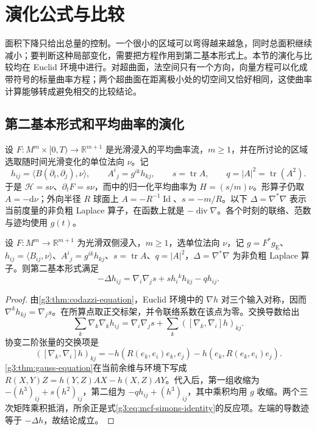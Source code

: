 
% 
% 

\section{演化公式与比较}
\label{g3:sec:2802}

面积下降只给出总量的控制。一个很小的区域可以弯得越来越急，同时总面积继续减小；要判断这种局部变化，需要把方程作用到第二基本形式上。本节的演化与比较均在 Euclid 环境中进行。对超曲面，法空间只有一个方向，向量方程可以化成带符号的标量曲率方程；两个超曲面在距离极小处的切空间又恰好相同，这使曲率计算能够转成避免相交的比较结论。

\subsection{第二基本形式和平均曲率的演化}
\label{g3:subsec:2802:01}
设 \(F:M^m\times[0,T)\to\mathbb R^{m+1}\) 是光滑浸入的平均曲率流，\(m\ge1\)，并在所讨论的区域选取随时间光滑变化的单位法向 \(\nu\)。记
\[
	h_{ij}=\langle B(\partial_i,\partial_j),\nu\rangle,
	\qquad A^i{}_j=g^{ik}h_{kj},
	\qquad s=\operatorname{tr}A,
	\qquad q=|A|^2=\operatorname{tr}(A^2).
\]
于是 \(\mathcal H=s\nu\)、\(\partial_tF=s\nu\)，而中的归一化平均曲率为 \(H=(s/m)\nu\)。形算子仍取 \(A=-\mathrm d\nu\)；外向半径 \(R\) 球面上 \(A=-R^{-1}\operatorname{Id}\)、\(s=-m/R\)。以下 \(\Delta=\nabla^*\nabla\) 表示当前度量的非负粗 Laplace 算子，在函数上就是 \(-\operatorname{div}\nabla\)。各个时刻的联络、范数与迹均使用 \(g(t)\)。

\begin{lemma}\label{g3:lem:mcf-simons-identity}
	设 \(F:M^m\to\mathbb R^{m+1}\) 为光滑双侧浸入，\(m\ge1\)，选单位法向 \(\nu\)，记 \(g=F^*g_{\mathrm E}\)、\(h_{ij}=\langle B_{ij},\nu\rangle\)、\(A^i{}_j=g^{ik}h_{kj}\)、\(s=\operatorname{tr}A\)、\(q=|A|^2\)，\(\Delta=\nabla^*\nabla\) 为非负粗 Laplace 算子。则第二基本形式满足
	\begin{equation}\label{g3:eq:mcf-simons-identity}
		-\Delta h_{ij}=\nabla_i\nabla_j s+s h_i{}^k h_{kj}-q h_{ij}.
	\end{equation}
\end{lemma}
\begin{proof}
	由\cref{g3:thm:codazzi-equation}，Euclid 环境中的 \(\nabla h\) 对三个输入对称，因而 \(\nabla^k h_{kj}=\nabla_j s\)。在所算点取正交标架，并令联络系数在该点为零。交换导数给出
	\[
		\sum_k\nabla_k\nabla_k h_{ij}
		=\nabla_i\nabla_j s+
		\sum_k([\nabla_k,\nabla_i]h)_{kj}.
	\]
	协变二阶张量的交换项是
	\[
		([\nabla_k,\nabla_i]h)_{kj}
		=-h(R(e_k,e_i)e_k,e_j)-h(e_k,R(e_k,e_i)e_j).
	\]
	\cref{g3:thm:gauss-equation}在当前余维与环境下写成
	\(R(X,Y)Z=h(Y,Z)AX-h(X,Z)AY\)。代入后，第一组收缩为
	\(- (h^3)_{ij}+s(h^2)_{ij}\)，第二组为
	\(-q h_{ij}+(h^3)_{ij}\)，其中乘积均用 \(g\) 收缩。两个三次矩阵乘积抵消，所余正是式\eqref{g3:eq:mcf-simons-identity}的反应项。左端的导数迹等于 \(-\Delta h\)，故结论成立。
\end{proof}

